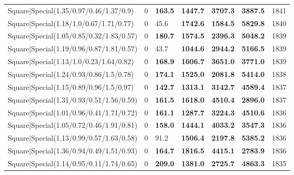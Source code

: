 \begin{tabular}{lrllllr}
 Square|Special(1.35/0.97/0.46/1.37/0.9)                       &             0   & \textbf{163.5} & \textbf{1447.7} & \textbf{3707.3} & \textbf{3887.5} &         1841 \\
 Square|Special(1.18/1.0/0.67/1.71/0.77)                       &             0   & 45.6           & \textbf{1742.6} & \textbf{1584.5} & \textbf{5829.8} &         1840 \\
 Square|Special(1.05/0.85/0.32/1.83/0.57)                      &             0   & \textbf{180.7} & \textbf{1574.5} & \textbf{2396.3} & \textbf{5048.2} &         1839 \\
 Square|Special(1.19/0.96/0.87/1.81/0.57)                      &             0   & 43.7           & \textbf{1044.6} & \textbf{2944.2} & \textbf{5166.5} &         1839 \\
 Square|Special(1.13/1.0/0.23/1.64/0.82)                       &             0   & \textbf{168.9} & \textbf{1606.7} & \textbf{3651.0} & \textbf{3771.0} &         1839 \\
 Square|Special(1.24/0.93/0.86/1.5/0.78)                       &             0   & \textbf{174.1} & \textbf{1525.0} & \textbf{2081.8} & \textbf{5414.0} &         1838 \\
 Square|Special(1.15/0.89/0.96/1.5/0.97)                       &             0   & \textbf{142.7} & \textbf{1313.1} & \textbf{3142.7} & \textbf{4589.4} &         1837 \\
 Square|Special(1.31/0.93/0.51/1.56/0.59)                      &             0   & \textbf{161.5} & \textbf{1618.0} & \textbf{4510.4} & \textbf{2896.0} &         1837 \\
 Square|Special(1.01/0.96/0.41/1.71/0.72)                      &             0   & \textbf{161.1} & \textbf{1287.7} & \textbf{3224.3} & \textbf{4510.6} &         1836 \\
 Square|Special(1.05/0.72/0.46/1.91/0.81)                      &             0   & \textbf{158.0} & \textbf{1444.1} & \textbf{4033.2} & \textbf{3547.3} &         1836 \\
 Square|Special(1.13/0.99/0.57/1.63/0.58)                      &             0   & 91.2           & \textbf{1506.4} & \textbf{2197.8} & \textbf{5385.2} &         1836 \\
 Square|Special(1.36/0.94/0.49/1.51/0.93)                      &             0   & \textbf{164.7} & \textbf{1816.5} & \textbf{4415.1} & \textbf{2783.9} &         1836 \\
 Square|Special(1.14/0.95/0.11/1.74/0.65)                      &             0   & \textbf{209.0} & \textbf{1381.0} & \textbf{2725.7} & \textbf{4863.3} &         1835 \\

\end{tabular}
